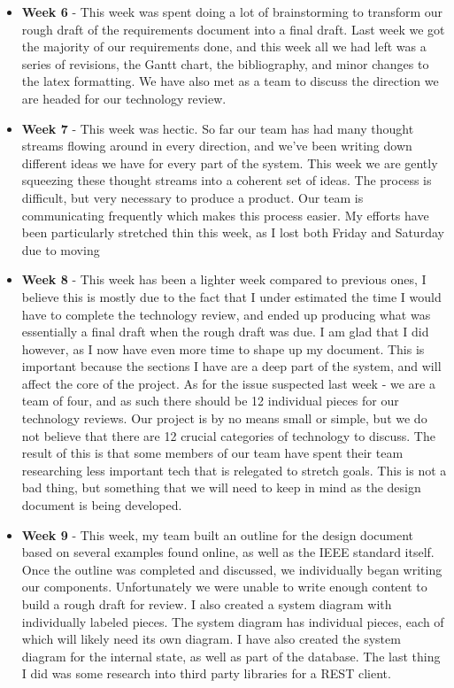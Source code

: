 \documentclass[onecolumn, draftclsnofoot,10pt, compsoc]{IEEEtran}
\begin{document}
\begin{itemize}
					\item \textbf{Week 6} - This week was spent doing a lot of brainstorming to transform our rough draft of the requirements document into a final draft. Last week we got the majority of our requirements done, and this week all we had left was a series of revisions, the Gantt chart, the bibliography, and minor changes to the latex formatting. We have also met as a team to discuss the direction we are headed for our technology review.
					\item \textbf{Week 7} - This week was hectic. So far our team has had many thought streams flowing around in every direction, and we've been writing down different ideas we have for every part of the system. This week we are gently squeezing these thought streams into a coherent set of ideas. The process is difficult, but very necessary to produce a product. Our team is communicating frequently which makes this process easier. My efforts have been particularly stretched thin this week, as I lost both Friday and Saturday due to moving
					\item \textbf{Week 8} - This week has been a lighter week compared to previous ones, I believe this is mostly due to the fact that I under estimated the time I would have to complete the technology review, and ended up producing what was essentially a final draft when the rough draft was due. I am glad that I did however, as I now have even more time to shape up my document. This is important because the sections I have are a deep part of the system, and will affect the core of the project. As for the issue suspected last week - we are a team of four, and as such there should be 12 individual pieces for our technology reviews. Our project is by no means small or simple, but we do not believe that there are 12 crucial categories of technology to discuss. The result of this is that some members of our team have spent their team researching less important tech that is relegated to stretch goals. This is not a bad thing, but something that we will need to keep in mind as the design document is being developed.
					\item \textbf{Week 9} - This week, my team built an outline for the design document based on several examples found online, as well as the IEEE standard itself. Once the outline was completed and discussed, we individually began writing our components. Unfortunately we were unable to write enough content to build a rough draft for review. I also created a system diagram with individually labeled pieces. The system diagram has individual pieces, each of which will likely need its own diagram. I have also created the system diagram for the internal state, as well as part of the database. The last thing I did was some research into third party libraries for a REST client.

\end{itemize}
\end{document}
